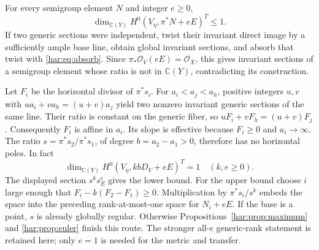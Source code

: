 For every semigroup element \(N\) and integer \(e\ge0\),
\[
 \dim_{\mathbb C(Y)}H^0(V_\eta,\pi^*N+eE)^T\le1.
\]
If two generic sections were independent, twist their invariant direct
image by a sufficiently ample base line, obtain global invariant
sections, and absorb that twist with \eqref{har:eq:absorb}. Since
\(\pi_*\mathcal O_V(eE)=\mathcal O_X\), this gives invariant sections
of a semigroup element whose ratio is not in \(\mathbb C(Y)\),
contradicting its construction.

Let \(F_i\) be the horizontal divisor of \(\pi^*s_i\). For
\(a_i<a_j<a_h\), positive integers \(u,v\) with
\(ua_i+va_h=(u+v)a_j\) yield two nonzero invariant generic sections
of the same line. Their ratio is constant on the generic fiber, so
\(uF_i+vF_h=(u+v)F_j\). Consequently \(F_i\) is affine in \(a_i\).
Its slope is effective because \(F_i\ge0\) and \(a_i\to\infty\).
The ratio \(s=\pi^*s_2/\pi^*s_1\), of degree \(b=a_2-a_1>0\),
therefore has no horizontal poles. In fact
\[
 \dim_{\mathbb C(Y)}H^0(V_\eta,kbD_V+eE)^T=1
 \quad(k,e\ge0).
\]
The displayed section \(s^ks_E^e\) gives the lower bound. For the
upper bound choose \(i\) large enough that
\(F_i-k(F_2-F_1)\ge0\). Multiplication by \(\pi^*s_i/s^k\) embeds
the space into the preceding rank-at-most-one space for \(N_i+eE\).
If the base is a point, \(s\) is already globally regular. Otherwise
Propositions~\ref{har:prop:maximum} and \ref{har:prop:euler} finish this
route. The stronger all-\(e\) generic-rank statement is retained here;
only \(e=1\) is needed for the metric and transfer.
